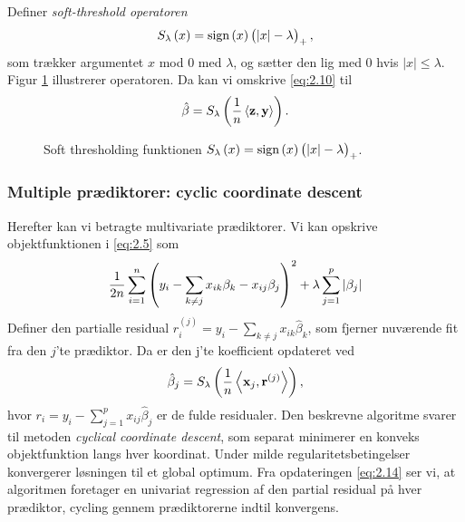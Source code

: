 Definer \textit{soft-threshold operatoren}
\begin{align*}
S_\lambda\del{x}=\text{sign}\del{x} \del{\vert x \vert - \lambda}_+,
\end{align*}
som trækker argumentet $x$ mod 0 med $\lambda$, og sætter den lig med 0 hvis $\vert x \vert \leq \lambda$. 
Figur \ref{fig:soft_thresholding_fct} illustrerer operatoren.
Da kan vi omskrive \eqref{eq:2.10} til
\begin{align*}
\hat{\beta} = S_\lambda \del{\frac{1}{n} \left\langle \mathbf{z}, \mathbf{y} \right\rangle}.
\end{align*}
%
\begin{figure}[H]
\centering
\scalebox{0.8}{}
\caption[optional short text]{Soft thresholding funktionen $S_\lambda\del{x}=\text{sign}\del{x} \del{\vert x \vert - \lambda}_+$.} \label{fig:soft_thresholding_fct}
\end{figure}
%
\subsubsection{Multiple prædiktorer: cyclic coordinate descent}
Herefter kan vi betragte multivariate prædiktorer. 
Vi kan opskrive objektfunktionen i \eqref{eq:2.5} som
\begin{align*}
\frac{1}{2n} \sum_{i=1}^n \del{y_i - \sum_{k \neq j} x_{ik} \beta_k - x_{ij} \beta_j}^2 + \lambda \sum_{j = 1}^p \vert \beta_j \vert
\end{align*}
Definer den partialle residual $r_i^{(j)}=y_i - \sum_{k \neq j} x_{ik} \hat{\beta}_k$, som fjerner nuværende fit fra den $j$'te prædiktor.
Da er den j'te koefficient opdateret ved
\begin{align}
\hat{\beta}_j = S_\lambda \del{\frac{1}{n} \left\langle \mathbf{x}_j, \mathbf{r}^{(j)} \right\rangle}, \label{eq:2.14}
\end{align}
hvor \(r_i = y_i - \sum_{j = 1}^p x_{ij} \hat{\beta}_j \) er de fulde residualer.
Den beskrevne algoritme svarer til metoden \textit{cyclical coordinate descent}, som separat minimerer en konveks objektfunktion langs hver koordinat.
Under milde regularitetsbetingelser konvergerer løsningen til et global optimum.
Fra opdateringen \eqref{eq:2.14} ser vi, at algoritmen foretager en univariat regression af den partial residual på hver prædiktor, cycling gennem prædiktorerne indtil konvergens.

